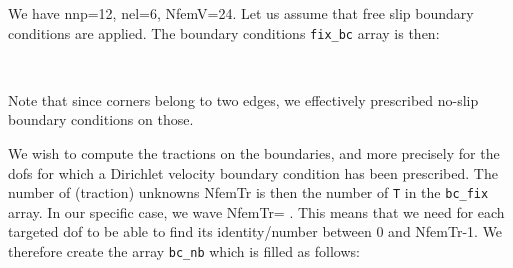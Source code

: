 We have nnp=12, nel=6, NfemV=24. Let us assume that free slip boundary conditions are applied. 
The boundary conditions {\tt fix\_bc} array is then:
\begin{center}
\\
\end{center}
Note that since corners belong to two edges, we effectively prescribed 
no-slip boundary conditions on those. 


We wish to compute the tractions on the boundaries, and more precisely for the dofs for which 
a Dirichlet velocity boundary condition has been prescribed.
The number of (traction) unknowns NfemTr is then the number of {\tt T} in the {\tt bc\_fix} array.
In our specific case, we wave NfemTr= .
This means that we need for each targeted dof to be able to find its identity/number
between 0 and NfemTr-1. We therefore create the array {\tt bc\_nb} which is 
filled as follows: 
 
